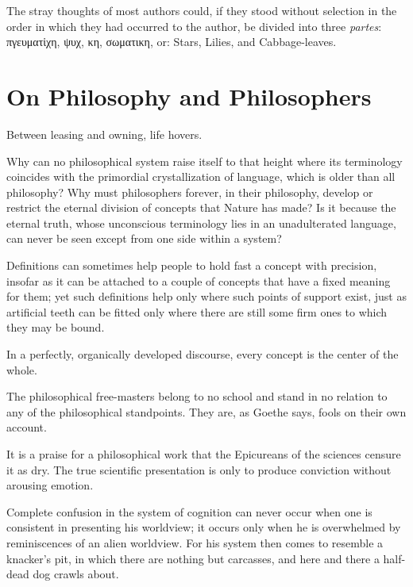 \documentclass[12pt,a4paper]{article}
\newcommand{\opage}[1]{\marginnote{\footnotesize\textit{[#1]}}}
\newcommand{\aphsep}{\par\smallskip\centerline{\textasteriskcentered}\smallskip}
\begin{document}
\aphsep

The stray thoughts of most authors could, if they stood without selection in the
order in which they had occurred to the author, be divided into three
\textit{partes}: πγευματἱχη, ψυχ, κη, σωματικη, or: Stars, Lilies, and
Cabbage-leaves.

\bigskip

\section*{On Philosophy and Philosophers}
\label{ch:002}

Between leasing and owning, life hovers.

\aphsep

Why can no philosophical system raise itself to that height where its
terminology coincides with the primordial crystallization of language, which is
older than all philosophy? Why must philosophers forever, in their philosophy,
develop or restrict the eternal division of concepts that Nature has made? Is it
because the eternal truth, whose unconscious terminology lies in an unadulterated
language, can never be seen except from one side within a system?

\aphsep

Definitions can sometimes help people to hold fast a concept with precision,
insofar as it can be attached to a couple of concepts that have a fixed meaning
for them; yet such definitions help only where such points of support exist,
just as artificial teeth can be fitted only where there are still some firm ones
to which they may be bound.

\aphsep

In a perfectly, organically developed discourse, every concept is the center of
the whole.

\aphsep

The philosophical free-masters belong to no school and stand in no relation to
any of the philosophical standpoints. They are, as Goethe says, fools on their
own account.

\opage{18}It is a praise for a philosophical work that the Epicureans of the
sciences censure it as dry. The true scientific presentation is only to produce
conviction without arousing emotion.

\aphsep

Complete confusion in the system of cognition can never occur when one is
consistent in presenting his worldview; it occurs only when he is overwhelmed by
reminiscences of an alien worldview. For his system then comes to resemble a
knacker's pit, in which there are nothing but carcasses, and here and there a
half-dead dog crawls about.
\end{document}

